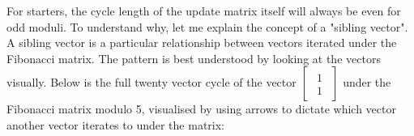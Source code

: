\documentclass[a4paper, 12pt, reqno]{amsart}
\begin{document}
			For starters, the cycle length of the update matrix itself will always be even for odd moduli. To
			understand why, let me explain the concept of a "sibling vector". A sibling vector is a particular relationship
			between vectors iterated under the Fibonacci matrix. The pattern is best understood by looking at the vectors
			visually. Below is the full twenty vector cycle of the vector
			$
				\begin{bmatrix}
					\begin{smallmatrix}
						1 \\
						1
					\end{smallmatrix}
				\end{bmatrix}
			$
			under the Fibonacci matrix modulo 5, visualised by using arrows to dictate which vector another vector iterates 
			to under the matrix:
			
\end{document}
